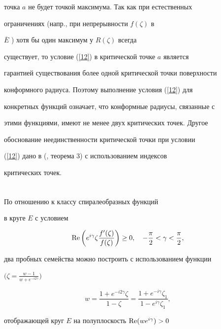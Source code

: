 точка $a$ не будет точкой максимума. Так как при естественных


ограничениях (напр., при непрерывности $f(\zeta)$ в


$\overline{E}$ \cite{1}) хотя бы один максимум у $R(\zeta)$ всегда


существует, то условие (\ref{12}) в критической точке $a$ является


гарантией существования более одной критической точки поверхности


конформного радиуса. Поэтому выполнение условия (\ref{12}) для


конкретных функций означает, что конформные радиусы, связанные с


этими функциями, имеют не менее двух критических точек. Другое


обоснование неединственности критической точки при условии


(\ref{12}) дано в (\cite{7}, теорема 3) с использованием индексов


критических точек.





\section{}





По отношению к классу спиралеобразных функций


в круге $E$ с условием


\begin{equation}\label{13}


\re\bigg(e^{i\gamma}\zeta\frac{f'(\zeta)}{f(\zeta)}\bigg)\geq0,\quad


-\frac{\pi}{2}<\gamma<\frac{\pi}{2},


\end{equation}


два пробных семейства можно построить с использованием функции


$\big(\zeta=\frac{w-1}{w+e^{-i2\gamma}}\big)$


$$


w=\frac{1+e^{-i2\gamma}\zeta}{1-\zeta}=


\frac{1+e^{-i\gamma}\zeta_1}{1-e^{i\gamma}\zeta_1},


$$


отображающей круг $E$ на полуплоскость $\operatorname{Re}(we^{i\gamma})>0$


